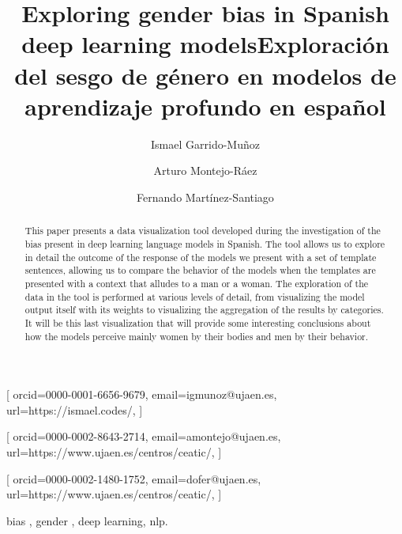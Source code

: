 \documentclass[
twocolumn,
]{ceurart}
\begin{document}


\title{Exploring gender bias in Spanish deep learning models}
\title[mode=trans]{Exploración del sesgo de género en modelos de aprendizaje profundo en español}
\author[1]{Ismael Garrido-Muñoz}[%
orcid=0000-0001-6656-9679,
email=igmunoz@ujaen.es,
url=https://ismael.codes/,
]

\author[1]{Arturo Montejo-Ráez}[%
orcid=0000-0002-8643-2714,
email=amontejo@ujaen.es,
url=https://www.ujaen.es/centros/ceatic/,
]

\author[1]{Fernando Martínez-Santiago}[%
orcid=0000-0002-1480-1752,
email=dofer@ujaen.es,
url=https://www.ujaen.es/centros/ceatic/,
]

\address[1]{Universidad de Jaén, Campus Las Lagunillas s/n, 23071 Jaén, España}

\begin{abstract}
This paper presents a data visualization tool developed during the investigation of the bias present in deep learning language models in Spanish. The tool allows us to explore in detail the outcome of the response of the models we present with a set of template sentences, allowing us to compare the behavior of the models when the templates are presented with a context that alludes to a man or a woman. The exploration of the data in the tool is performed at various levels of detail, from visualizing the model output itself with its weights to visualizing the aggregation of the results by categories. It will be this last visualization that will provide some interesting conclusions about how the models perceive mainly women by their bodies and men by their behavior.
\end{abstract}

\begin{keywords}
  bias \sep
  gender \sep
  deep learning\sep
  nlp.
\end{keywords}
\end{document}
